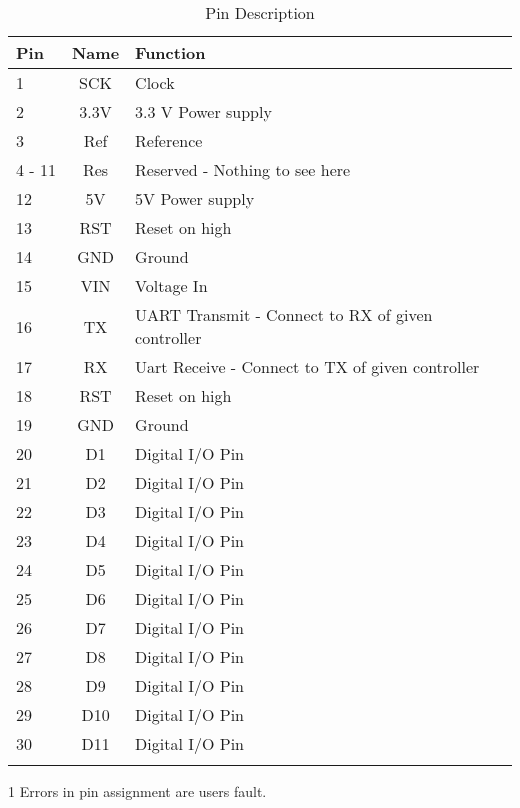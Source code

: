 \documentclass[10pt]{datasheet}
\begin{document}
\begin{table}[h]
\begin{threeparttable}
\caption{Pin Description}
\begin{tabularx}{\textwidth}{l | c | X}
    \thickhline
    \textbf{Pin} & \textbf{Name} & \textbf{Function}\\
    \hline
    1  		& SCK 	& Clock \\
    \hline
    2 		& 3.3V 	& 3.3 V Power supply  \\
    \hline
    3		& Ref	& Reference \\
    \hline
    4 - 11 	& Res	& Reserved - Nothing to see here \\
    \hline
    12  	& 5V  	& 5V Power supply \\
    \hline
    13  	& RST 	& Reset on high \\
    \hline
    14  	& GND 	& Ground \\
    \hline
    15  	& VIN 	& Voltage In \\
    \hline
    16  	& TX  	& UART Transmit - Connect to RX of given controller \\
    \hline
    17  	& RX  	& Uart Receive - Connect to TX of given controller \\
    \hline
    18  	& RST 	& Reset on high \\
    \hline
    19  	& GND 	& Ground \\
    \hline
    20  	& D1  	& Digital I/O Pin \\
    \hline
    21  	& D2  	& Digital I/O Pin \\
    \hline
    22  	& D3  	& Digital I/O Pin \\
    \hline
    23  	& D4  	& Digital I/O Pin \\
    \hline
    24  	& D5  	& Digital I/O Pin \\
    \hline
    25  	& D6  	& Digital I/O Pin \\
    \hline
    26  	& D7  	& Digital I/O Pin \\
    \hline
    27  	& D8  	& Digital I/O Pin \\
    \hline
    28  	& D9  	& Digital I/O Pin \\
    \hline
    29  	& D10 	& Digital I/O Pin \\
    \hline
    30  	& D11 	& Digital I/O Pin \\
    \thickhline
\end{tabularx}
\begin{tablenotes}
\item[1]{Errors in pin assignment are users fault.}
\end{tablenotes}
\end{threeparttable}
\end{table}
\end{document}
